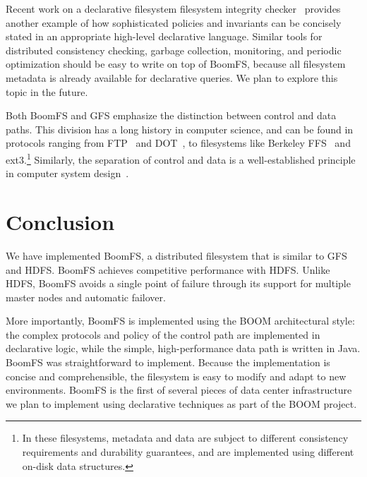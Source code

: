 \documentclass[twocolumn]{article}
\begin{document}
Recent work on a declarative filesystem filesystem integrity
checker~\cite{sqck} provides another example of how sophisticated
policies and invariants can be concisely stated in an appropriate
high-level declarative language. Similar tools for distributed
consistency checking, garbage collection, monitoring, and periodic
optimization should be easy to write on top of BoomFS, because all
filesystem metadata is already available for declarative queries. We
plan to explore this topic in the future.

Both BoomFS and GFS emphasize the distinction between control and data
paths. This division has a long history in computer science, and can
be found in protocols ranging from FTP~\cite{ftp-rfc} and
DOT~\cite{dot}, to filesystems like Berkeley FFS~\cite{ffs} and
ext3.\footnote{In these filesystems, metadata and data are subject to
  different consistency requirements and durability guarantees, and
  are implemented using different on-disk data structures.} Similarly,
the separation of control and data is a well-established principle in
computer system design~\cite{hydra-policy-mech-sep}.

\section{Conclusion}
\label{conclusion}
We have implemented BoomFS, a distributed filesystem that is similar
to GFS and HDFS. BoomFS achieves competitive performance with
HDFS. Unlike HDFS, BoomFS avoids a single point of failure through its
support for multiple master nodes and automatic failover.

More importantly, BoomFS is implemented using the BOOM architectural
style: the complex protocols and policy of the control path are
implemented in declarative logic, while the simple, high-performance
data path is written in Java. BoomFS was straightforward to
implement. Because the implementation is concise and comprehensible,
the filesystem is easy to modify and adapt to new environments. BoomFS
is the first of several pieces of data center infrastructure we plan
to implement using declarative techniques as part of the BOOM project.



\end{document}
